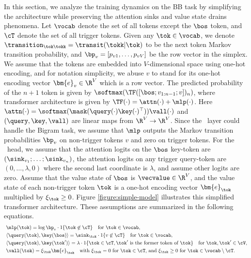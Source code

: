 In this section, we analyze the training dynamics on the BB task by simplifying the architecture while preserving the attention sinks and value state drains phenomena. Let $\vocab$ denote the set of all tokens except the $\bos$ token, and $\cT$ denote the set of all trigger tokens. Given any $\tok \in \vocab$, we denote $\transition_{\tok\tokk}=\transit(\tokk|\tok)$ to be the next token Markov transition probability, and $\bp_v = [p_{v1}, \ldots, p_{vV}]$ be the row vector in the simplex. We assume that the tokens are embedded into $V$-dimensional space using one-hot encoding, and for notation simplicity, we abuse $v$ to stand for its one-hot encoding vector $\bm{e}_v \in \R^V$ which is a row vector. The predicted probability of the $n+1$ token is given by $\softmax(\TF([\bos; v_{1:n-1}; v])_n)$, where transformer architecture is given by $\TF(\cdot) = \attn(\cdot ) + \mlp(\cdot )$. Here $\attn(\cdot ) = \softmax(\mask(\query(\cdot ) \key(\cdot )^\top )) \vall(\cdot )$ and $(\query, \key, \vall)$ are linear maps from $\R^V \to \R^V$. Since the \mlp~layer could handle the Bigram task, we assume that $\mlp$ outputs the Markov transition probabilities $\bp_v$ on non-trigger tokens $v$ and zero on trigger tokens. For the \attn~head, we assume that the attention logits on the $\bos$ key-token are $(\sink_{v_1}; \ldots; \sink_{v_n})$, the attention logits on any trigger query-token are $(0, \ldots, \lambda, 0)$ where the second last coordinate is $\lambda$, and assume other logits are zero. Assume that the value state of $\bos$ is $\vecvalue \in \R^V$, and the value state of each non-trigger token $\tok$ is a one-hot encoding vector $\bm{e}_\tok$ multiplied by $\xi_\tok \geq 0$. Figure \ref{figure:simple-model} illustrates this simplified transformer architecture. These assumptions are summarized in the following equations. 
\begin{equation}\label{eqn:simplification_TF}
\begin{aligned}
&~ \mlp(\tok) = \log \bp_v \cdot 1\{ \tok \not\in \cT  \} ~~~ \text{for } \tok \in \vocab,\\
&~\langle \query(\tok), \key(\bos) \rangle =\sink_\tok \cdot 1 \{ v \not\in \cT \}~~~\text{for } \tok\in\vocab, \\
&~\langle \query(\tok), \key(\tok') \rangle = \lambda \cdot 1\{ \tok \in \cT, \tok' \text{ is the former token of } \tok \} ~~~\text{for } \tok, \tok' \in \cV, \\
&~ \vall(\tok) = \xi_\tok \bm{e}_\tok  ~~~\text{with $\xi_\tok=0$ for $\tok\in\cT$, and $\xi_\tok\geq 0$ for $\tok\in\vocab\setminus\cT$.}
\end{aligned}
\end{equation}

